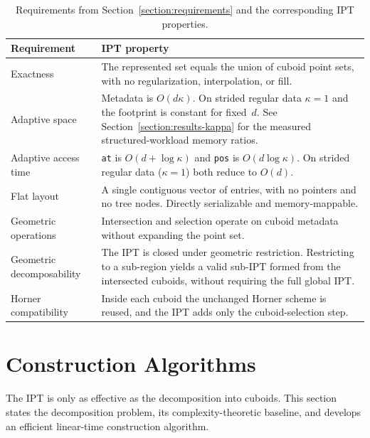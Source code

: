 \documentclass[manuscript,screen,review]{acmart}
\theoremstyle{definition}
\theoremstyle{plain}
\begin{document}
\begin{table}[ht]
\caption{Requirements from Section~\ref{section:requirements} and the corresponding IPT properties.}
\label{table:requirements-summary}
\begin{tabular}{lp{}}
\toprule
Requirement & IPT property \\
\midrule
Exactness
  & The represented set equals the union of cuboid point
    sets, with no regularization, interpolation, or fill. \\
Adaptive space
  & Metadata is $O(d\kappa)$. On strided regular data $\kappa = 1$
    and the footprint is constant for fixed~$d$.
    See Section~\ref{section:results-kappa} for the measured
    structured-workload memory ratios. \\
Adaptive access time
  & \texttt{at} is $O(d+\log\kappa)$ and \texttt{pos} is
    $O(d\log\kappa)$.
    On strided regular data ($\kappa = 1$) both reduce to $O(d)$. \\
Flat layout
  & A single contiguous vector of entries, with no pointers and no
    tree nodes. Directly serializable and memory-mappable. \\
Geometric operations
  & Intersection and selection operate on cuboid metadata
    without expanding the point set. \\
Geometric decomposability
  & The IPT is closed under geometric restriction. Restricting
    to a sub-region yields a valid sub-IPT formed from the
    intersected cuboids, without requiring the full global IPT. \\
Horner compatibility
  & Inside each cuboid the unchanged Horner scheme
    is reused, and the IPT adds only the cuboid-selection step. \\
\bottomrule
\end{tabular}
\end{table}

\section{Construction Algorithms}
\label{section:construction}

The IPT is only as effective as the decomposition into cuboids. This
section states the decomposition problem, its complexity-theoretic
baseline, and develops an efficient linear-time construction algorithm.
\end{document}
